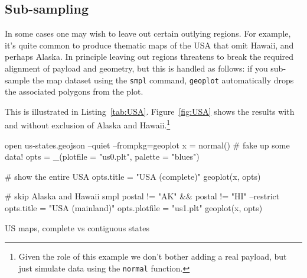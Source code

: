 \documentclass{article}
\begin{document}
\subsection{Sub-sampling}
\label{sec:sub-sample}

In some cases one may wish to leave out certain outlying regions. For
example, it's quite common to produce thematic maps of the USA that
omit Hawaii, and perhaps Alaska. In principle leaving out regions
threatens to break the required alignment of payload and geometry, but
this is handled as follows: if you sub-sample the map dataset using
the \texttt{smpl} command, \texttt{geoplot} automatically drops the
associated polygons from the plot.

This is illustrated in Listing~\ref{tab:USA}. Figure~\ref{fig:USA}
shows the results with and without exclusion of Alaska and
Hawaii.\footnote{Given the role of this example we don't bother adding
  a real payload, but just simulate data using the \texttt{normal}
  function.}

\begin{script}[p]
  \begin{scode}
open us-states.geojson --quiet --frompkg=geoplot
x = normal() # fake up some data!
opts = _(plotfile = "us0.plt", palette = "blues")

# show the entire USA
opts.title = "USA (complete)"
geoplot(x, opts)

# skip Alaska and Hawaii
smpl postal != "AK" && postal != "HI" --restrict
opts.title = "USA (mainland)"
opts.plotfile = "us1.plt"
geoplot(x, opts)
  \end{scode}
  \caption{US maps, complete vs contiguous states}
  \label{tab:USA}
\end{script}
\end{document}

